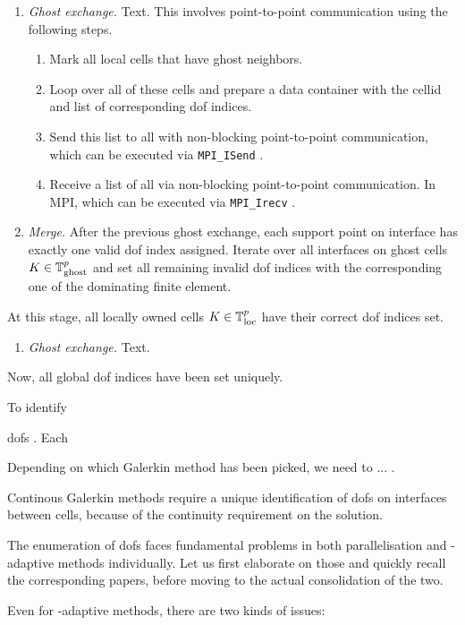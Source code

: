 \begin{enumerate}[resume]
  \item \textit{Ghost exchange.}
  Text.
  This involves point-to-point communication using the following steps.
  \begin{enumerate}[label=\alph*.]
    \item Mark all local cells that have ghost neighbors.
    \item Loop over all of these cells and prepare a data container with the cellid and list of corresponding dof indices.
    \item Send this list to all
    with non-blocking point-to-point communication, which can be executed via \texttt{MPI\_ISend} \parencite{mpi31}.
    \item Receive a list of all via non-blocking point-to-point communication. In MPI, which can be executed via \texttt{MPI\_Irecv} \parencite{mpi31}.
  \end{enumerate}
  \item \textit{Merge.}
  After the previous ghost exchange, each support point on interface has exactly one valid \gls{dof} index assigned. Iterate over all interfaces on ghost cells $K \in \mathbb{T}^p_{\text{ghost}}$ and set all remaining invalid \gls{dof} indices with the corresponding one of the dominating finite element.
\end{enumerate}
At this stage, all locally owned cells $K \in \mathbb{T}^p_{\text{loc}}$ have their correct \gls{dof} indices set.
\begin{enumerate}[resume]
  \item \textit{Ghost exchange.}
  Text.
\end{enumerate}
Now, all global \gls{dof} indices have been set uniquely.


To identify 

\glspl{dof} . Each

Depending on which Galerkin method has been picked, we need to ... .

Continous Galerkin methods require a unique identification of \glspl{dof} on interfaces between cells, because of the continuity requirement on the solution.




The enumeration of dofs faces fundamental problems in both parallelisation and \hp-adaptive methods individually. Let us first elaborate on those and quickly recall the corresponding papers, before moving to the actual consolidation of the two.

Even for \hp-adaptive methods, there are two kinds of issues:

